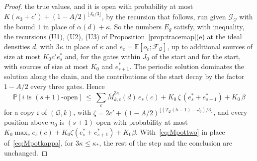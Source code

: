\documentclass[11pt]{amsart}
\theoremstyle{definition}
\theoremstyle{remark}
\newcommand{\PP}{\mathbb{P}}
\newcommand{\EE}{\mathbb{E}}
\begin{document}
\begin{proof}
the true values, and it is open with probability at most
$K(\kappa_3+c')+(1-A/2)^{\lfloor J_0/3\rfloor}$, by the recursion that follows, run given
$\mathcal G_{\mathcal Q}$ with the bound $1$ in place of $\alpha(d)+\kappa$.
So the numbers $E_g$ satisfy, with inequality, the recursions (U1), (U2), (U3) of
Proposition~\ref{prop:tracemap}(e) at the ideal densities $d$, with $3\kappa$ in place of
$\kappa$ and $e_c=\EE[o_c;\mathcal F_{\mathcal Q}]$, up to additional sources of size at most
$K_0c'e^*_s$ and, for the gates within $J_0$ of the start and for the start, with sources of
size at most $K_0$ and $e^*_{s+1}$. The periodic solution dominates the solution along the
chain, and the contributions of the start decay by the factor $1-A/2$ every three gates. Hence
\[
\PP[i\text{ is }(s+1)\text{-open}]\ \le\ \sum_c\overline M^{3\kappa}_{k,c}(d)\,e_s(c)+K_0\,\zeta\,(e^*_s+e^*_{s+1})+K_0\,\beta
\]
for a copy $i$ of $(\mathcal Q,k)$, with
$\zeta=2c'+(1-A/2)^{\lfloor(T_{\mathcal Q}(h-1)-J_0)/3\rfloor}$, and every position above $n_0$
is $(s+1)$-open with probability at most
$K_0\max_ce_s(c)+K_0\zeta(e^*_s+e^*_{s+1})+K_0\beta$. With~\eqref{eq:Mpottwo} in place
of~\eqref{eq:Mpotkappa}, for $3\kappa\le\kappa_*$, the rest of the step and the conclusion are
unchanged.
\end{proof}
\end{document}
